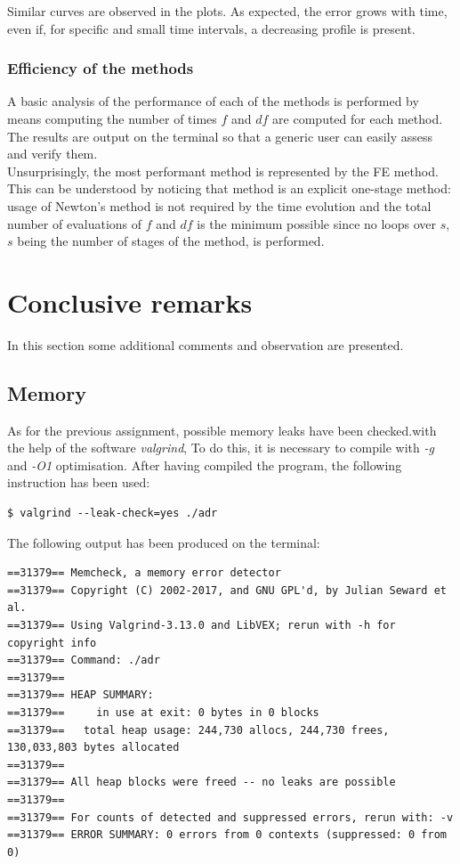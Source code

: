 \documentclass[11pt]{article}
\theoremstyle{theorem}
\theoremstyle{definition}
\begin{document}
Similar curves are observed in the plots. As expected, the error grows with time, even if, for specific and small time intervals, a decreasing profile is present.\\

\subsubsection{Efficiency of the methods}
A basic analysis of the performance of each of the methods is performed by means computing the number of times $f$ and $df$ are computed for each method. The results are output on the terminal so that a generic user can easily assess and verify them.\\
Unsurprisingly, the most performant method is represented by the FE method. This can be understood by noticing that method is an explicit one-stage method: usage of Newton's method is not required by the time evolution and the total number of evaluations of $f$ and $df$ is the minimum possible since no loops over $s$, $s$ being the number of stages of the method, is performed.\\

\section{Conclusive remarks}
In this section some additional comments and observation are presented.

\subsection{Memory}
As for the previous assignment, possible memory leaks have been checked.with the help of the software \emph{valgrind}, To do this, it is necessary to compile with \emph{-g} and \emph{-O1} optimisation. After having compiled the program, the following instruction has been used:


\begin{lstlisting}
$ valgrind --leak-check=yes ./adr
\end{lstlisting}


The following output has been produced on the terminal:

\begin{verbatim}
==31379== Memcheck, a memory error detector
==31379== Copyright (C) 2002-2017, and GNU GPL'd, by Julian Seward et al.
==31379== Using Valgrind-3.13.0 and LibVEX; rerun with -h for copyright info
==31379== Command: ./adr
==31379==
==31379== HEAP SUMMARY:
==31379==     in use at exit: 0 bytes in 0 blocks
==31379==   total heap usage: 244,730 allocs, 244,730 frees, 130,033,803 bytes allocated
==31379==
==31379== All heap blocks were freed -- no leaks are possible
==31379==
==31379== For counts of detected and suppressed errors, rerun with: -v
==31379== ERROR SUMMARY: 0 errors from 0 contexts (suppressed: 0 from 0)
\end{verbatim}
\end{document}
